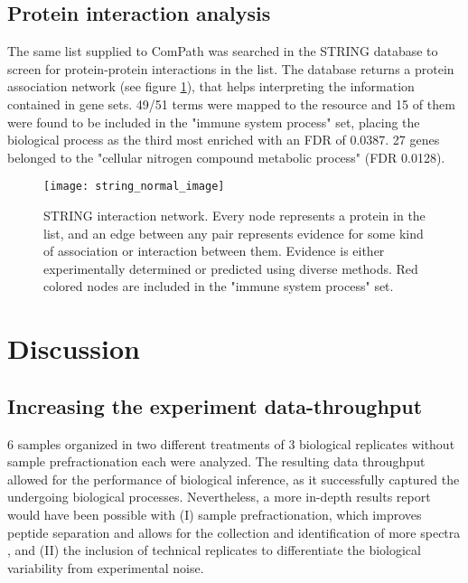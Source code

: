 \subsection{Protein interaction analysis}

The same list supplied to ComPath was searched in the STRING database \cite{Szklarczyk2017} to screen for protein-protein interactions in the list. The database returns a protein association network (see figure \ref{fig:STRING}), that helps interpreting the information contained in gene sets. 49/51 terms were mapped to the resource and 15 of them were found to be included in the "immune system process" set, placing the biological process as the third most enriched with an FDR of 0.0387. 27 genes belonged to the "cellular nitrogen compound metabolic process" (FDR 0.0128).

\begin{figure}[!h]
\centering
\texttt{[image: string\_normal\_image]}
\caption[Protein interaction network]{STRING interaction network. Every node represents a protein in the list, and an edge between any pair represents evidence for some kind of association or interaction between them. Evidence is either experimentally determined or predicted using diverse methods. Red colored nodes are included in the "immune system process" set.}
\label{fig:STRING}
\end{figure}





\section{Discussion}

\subsection{Increasing the experiment data-throughput}

6 samples organized in two different treatments of 3 biological replicates without sample prefractionation each were analyzed. The resulting data throughput allowed for the performance of biological inference, as it successfully captured the undergoing biological processes. Nevertheless, a more in-depth results report would have been possible with (I) sample prefractionation, which improves peptide separation and allows for the collection and identification of more spectra \cite{Righetti2005}, and (II) the inclusion of technical replicates to differentiate the biological variability from experimental noise.

